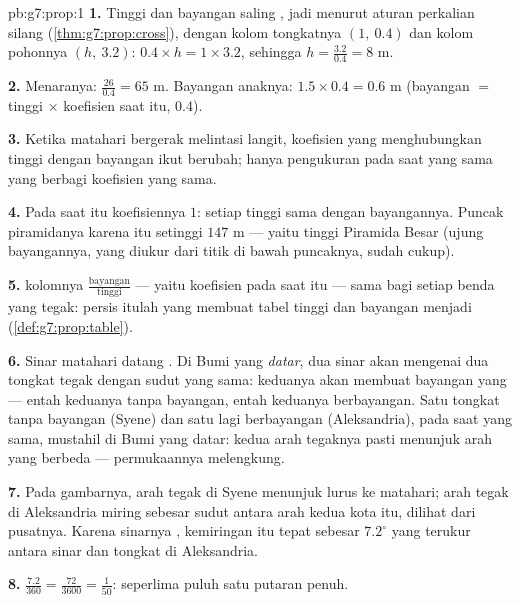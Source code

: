 \begin{solution}{pb:g7:prop:1}
\textbf{1.} Tinggi dan bayangan saling , jadi menurut
aturan perkalian silang (\cref{thm:g7:prop:cross}), dengan kolom
tongkatnya $(1,\ 0.4)$ dan kolom pohonnya $(h,\ 3.2)$:
$0.4 \times h = 1 \times 3.2$, sehingga
$h = \frac{3.2}{0.4} = 8$ m.

\textbf{2.} Menaranya: $\frac{26}{0.4} = 65$ m. Bayangan anaknya:
$1.5 \times 0.4 = 0.6$ m (bayangan $=$ tinggi $\times$ koefisien
saat itu, $0.4$).

\textbf{3.} Ketika matahari bergerak melintasi langit, koefisien
yang menghubungkan tinggi dengan bayangan ikut berubah; hanya
pengukuran pada saat yang sama yang berbagi koefisien yang sama.

\textbf{4.} Pada saat itu koefisiennya $1$: setiap tinggi sama dengan
bayangannya. Puncak piramidanya karena itu setinggi
$147$ m --- yaitu tinggi Piramida Besar (ujung bayangannya, yang
diukur dari titik di bawah puncaknya, sudah cukup).

\textbf{5.}  kolomnya
$\frac{\text{bayangan}}{\text{tinggi}}$ --- yaitu koefisien
 pada saat itu --- sama bagi setiap benda yang
tegak: persis itulah yang membuat tabel tinggi dan bayangan menjadi
 (\cref{def:g7:prop:table}).

\textbf{6.} Sinar matahari datang . Di Bumi yang \emph{datar},
dua sinar  akan mengenai dua tongkat tegak dengan sudut yang
sama: keduanya akan membuat bayangan yang  --- entah
keduanya tanpa bayangan, entah keduanya berbayangan. Satu tongkat
tanpa bayangan (Syene) dan satu lagi berbayangan (Aleksandria), pada
saat yang sama, mustahil di Bumi yang datar: kedua arah tegaknya
pasti menunjuk arah yang berbeda --- permukaannya melengkung.

\textbf{7.} Pada gambarnya, arah tegak di Syene menunjuk lurus ke
matahari; arah tegak di Aleksandria miring sebesar sudut antara arah
kedua kota itu, dilihat dari pusatnya. Karena sinarnya ,
kemiringan itu tepat sebesar $7.2^\circ$ yang terukur antara sinar
dan tongkat di Aleksandria.

\textbf{8.} $\frac{7.2}{360} = \frac{72}{3600} = \frac{1}{50}$:
seperlima puluh satu putaran penuh.


\end{solution}
